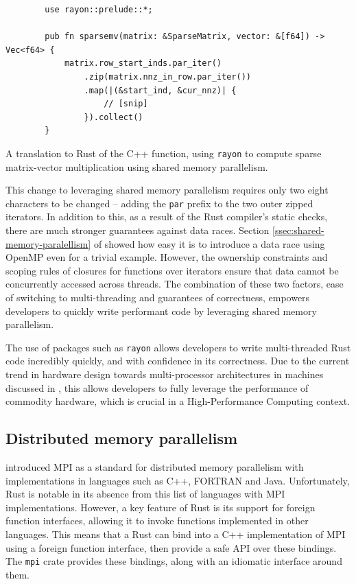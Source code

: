 \begin{code}
    \begin{verbatim}
        use rayon::prelude::*;
        
        pub fn sparsemv(matrix: &SparseMatrix, vector: &[f64]) -> Vec<f64> {
            matrix.row_start_inds.par_iter()
                .zip(matrix.nnz_in_row.par_iter())
                .map(|(&start_ind, &cur_nnz)| {
                    // [snip]
                }).collect()
        }
    \end{verbatim}
    \caption{A translation to Rust of the C++ function, using \texttt{rayon} to compute sparse matrix-vector multiplication using shared memory parallelism.}
    \label{listing:rust-sparsemv-rayon}
\end{code}

This change to leveraging shared memory parallelism requires only two eight characters to be changed -- adding the \texttt{par} prefix to the two outer zipped iterators. In addition to this, as a result of the Rust compiler's static checks, there are much stronger guarantees against data races. Section \ref{ssec:shared-memory-paralellism} of  showed how easy it is to introduce a data race using OpenMP even for a trivial example. However, the ownership constraints and scoping rules of closures for functions over iterators ensure that data cannot be concurrently accessed across threads. The combination of these two factors, ease of switching to multi-threading and guarantees of correctness, empowers developers to quickly write performant code by leveraging shared memory parallelism.

The use of packages such as \texttt{rayon} allows developers to write multi-threaded Rust code incredibly quickly, and with confidence in its correctness. Due to the current trend in hardware design towards multi-processor architectures in machines discussed in , this allows developers to fully leverage the performance of commodity hardware, which is crucial in a High-Performance Computing context.

\subsection{Distributed memory parallelism}
\label{sec:translation-mpi}

 introduced MPI as a standard for distributed memory parallelism with implementations in languages such as C++, FORTRAN and Java. Unfortunately, Rust is notable in its absence from this list of languages with MPI implementations. However, a key feature of Rust is its support for foreign function interfaces, allowing it to invoke functions implemented in other languages. This means that a Rust can bind into a C++ implementation of MPI using a foreign function interface, then provide a safe API over these bindings. The \texttt{mpi} crate \cite{noauthor_rsmpirsmpi_2024} %
provides these bindings, along with an idiomatic interface around them.

